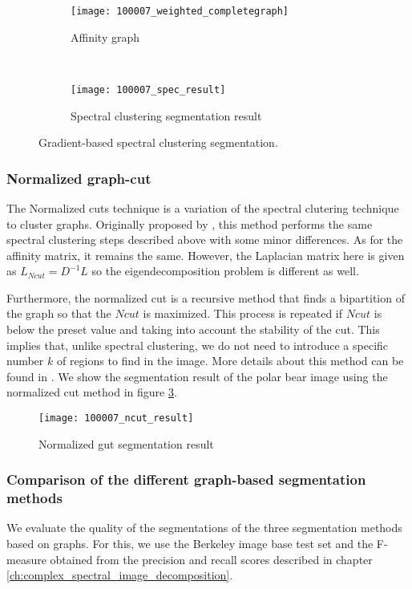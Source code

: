 \begin{figure}[!ht]
    \centering
    \begin{subfigure}[b]{0.45\textwidth}
    	\texttt{[image: 100007\_weighted\_completegraph]} 
    	\caption{Affinity graph}
    \end{subfigure}      
    ~ %
    \begin{subfigure}[b]{0.45\textwidth}
        \texttt{[image: 100007\_spec\_result]}
        \caption{Spectral clustering segmentation result}
        \label{fig:spectral_clustering_segm_result} 
    \end{subfigure}    
	\caption{Gradient-based spectral clustering segmentation.}\label{fig:spectral_clustering_process}    
\end{figure}


\subsubsection{Normalized graph-cut}
The Normalized cuts technique is a variation of the spectral clutering technique to cluster graphs. Originally proposed by \cite{JianboShi.Malik:PAMI:2000}, this method performs the same spectral clustering steps described above with some minor differences. As for the affinity matrix, it remains the same. However, the Laplacian matrix here is given as
$L_{Ncut} = D^{-1}L$
so the eigendecomposition problem is different as well.

Furthermore, the normalized cut is a recursive method that finds a bipartition of the graph so that the $Ncut$ is maximized. This process is repeated if $Ncut$ is below the preset value and taking into account the stability of the cut. This implies that, unlike spectral clustering, we do not need to introduce a specific number $k$ of regions to find in the image. More details about this method can be found in \cite{JianboShi.Malik:PAMI:2000}. We show the segmentation result of the polar bear image using the normalized cut method in figure \ref{fig:norm_cut_segm_result}. 

\begin{figure}[!ht]
    \centering
  	\texttt{[image: 100007\_ncut\_result]}
    \caption{Normalized gut segmentation result}
    \label{fig:norm_cut_segm_result}    
\end{figure}


\subsubsection{Comparison of the different graph-based segmentation methods}
We evaluate the quality of the segmentations of the three segmentation methods based on graphs. For this, we use the Berkeley image base test set and the F-measure obtained from the precision and recall scores described in chapter \ref{ch:complex_spectral_image_decomposition}. 

